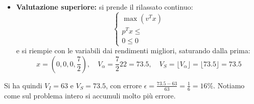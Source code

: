 \documentclass[a4paper,11pt]{article}
\begin{document}
\begin{itemize}
\begin{itemize}
		\item \textbf{Valutazione superiore:} si prende il rilassato continuo:
			\[
				\begin{cases}
					\max (v^T x) \\ 
					p^T x \leq \\ 
					0 \leq 0
				\end{cases}
			\]
			e si riempie con le variabili dai rendimenti migliori, saturando dalla prima:
			$$ x = \left( 0, 0, 0, \frac{7}{2} \right), \quad V_\alpha = \frac{7}{2} 22 = 73.5, \quad V_S = \lfloor V_\alpha \rfloor = \lfloor 73.5 \rfloor = 73.5 $$
	\end{itemize}
	Si ha quindi $V_I = 63$ e $V_S = 73.5$, con errore $\epsilon = \frac{73.5 - 63}{63} = \frac{1}{6} = 16\%$.
	Notiamo come sul problema intero si accumuli molto più errore.
\end{itemize}
\end{document}
